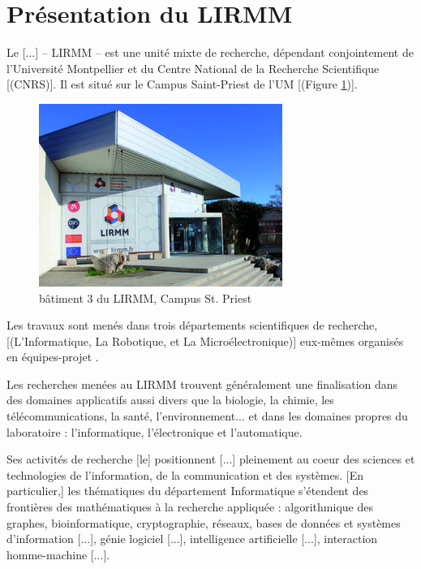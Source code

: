 \documentclass[a4paper,12pt]{report}
\theoremstyle{break}
\theoremstyle{break}
\theoremstyle{break}
\theoremstyle{break}
\theoremstyle{definition}
\theoremstyle{remark}
\begin{document}
\section{Présentation du LIRMM}
\og Le [...] – LIRMM – est une unité mixte de recherche, dépendant conjointement de l'Université Montpellier et du Centre National de la Recherche Scientifique [(CNRS)]. Il est situé sur le Campus Saint-Priest de l'UM [(Figure \ref{fig:lirmmPhoto})].

\begin{figure}[!ht]
  \centering
  \includegraphics[scale=0.9]{images/lirmmPhoto.jpg}
  \caption{bâtiment 3 du LIRMM, Campus St. Priest}
  \label{fig:lirmmPhoto}
\end{figure}

Les travaux sont menés dans trois départements scientifiques de recherche, [(L’Informatique, La Robotique, et La Microélectronique)] eux-mêmes organisés en \og équipes-projet \fg.

Les recherches menées au LIRMM trouvent généralement une finalisation dans des domaines applicatifs aussi divers que la biologie, la chimie, les télécommunications, la santé, l'environnement... et dans les domaines propres du laboratoire : l'informatique, l'électronique et l'automatique.

Ses activités de recherche [le] positionnent [...] pleinement au coeur des sciences et technologies de l’information, de la communication et des systèmes. [En particulier,] les thématiques du département Informatique s’étendent des frontières des mathématiques à la recherche appliquée : algorithmique des graphes, bioinformatique, cryptographie, réseaux, bases de données et systèmes d'information [...], génie logiciel [...], intelligence artificielle [...], interaction homme-machine [...]. \fg{} \citep{lirmmPres}
\end{document}
